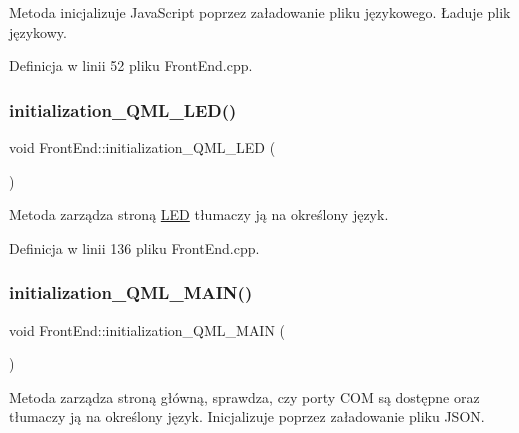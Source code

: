 Metoda inicjalizuje Java\+Script poprzez załadowanie pliku językowego. Ładuje plik językowy. 

Definicja w linii 52 pliku Front\+End.\+cpp.

\mbox{\label{class_front_end_space_1_1_front_end_a9d9c153b4dccf230a2a674008c89bf58}} 
\subsubsection{\texorpdfstring{initialization\+\_\+\+Q\+M\+L\+\_\+\+L\+E\+D()}{initialization\_QML\_LED()}}
{\footnotesize\ttfamily void Front\+End\+::initialization\+\_\+\+Q\+M\+L\+\_\+\+L\+ED (\begin{DoxyParamCaption}{ }\end{DoxyParamCaption})}

Metoda zarządza stroną \hyperlink{class_l_e_d}{L\+ED} tłumaczy ją na określony język. 

Definicja w linii 136 pliku Front\+End.\+cpp.

\mbox{\label{class_front_end_space_1_1_front_end_a3297ab537801620510042bc090f57388}} 
\subsubsection{\texorpdfstring{initialization\+\_\+\+Q\+M\+L\+\_\+\+M\+A\+I\+N()}{initialization\_QML\_MAIN()}}
{\footnotesize\ttfamily void Front\+End\+::initialization\+\_\+\+Q\+M\+L\+\_\+\+M\+A\+IN (\begin{DoxyParamCaption}{ }\end{DoxyParamCaption})}

Metoda zarządza stroną główną, sprawdza, czy porty C\+OM są dostępne oraz tłumaczy ją na określony język. Inicjalizuje poprzez załadowanie pliku J\+S\+ON.

